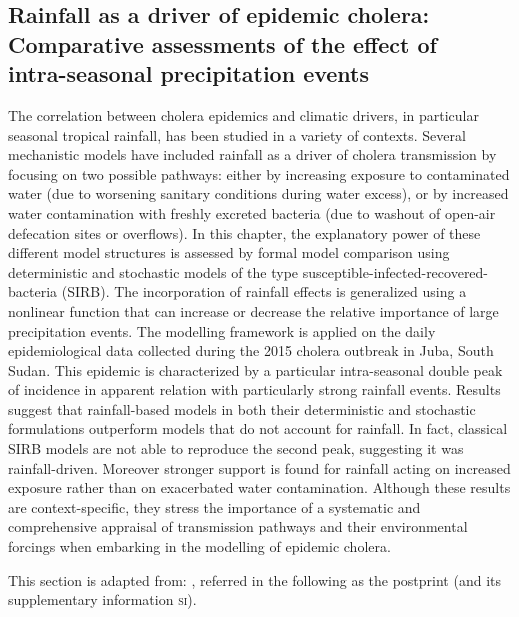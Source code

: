 \begin{fullwidth}
\chapter[Rainfall as a driver of epidemic cholera: Comparative assessments of the effect of intra-seasonal precipitation events]{Rainfall as a driver of epidemic cholera:\\Comparative assessments of the effect of\\intra-seasonal precipitation events}\label{ch:cholera-rainfall}

The correlation between cholera epidemics and climatic drivers, in particular seasonal tropical rainfall, has been studied in a variety of contexts. Several mechanistic models have included rainfall as a driver of cholera transmission by focusing on two possible pathways: either by increasing exposure to contaminated water (\eg due to worsening sanitary conditions during water excess), or by increased water contamination with freshly excreted bacteria (\eg due to washout of open-air defecation sites or overflows). In this chapter, the explanatory power of these different model structures is assessed by formal model comparison using deterministic and stochastic models of the type susceptible-infected-recovered-bacteria (SIRB). The incorporation of rainfall effects is generalized using a nonlinear function that can increase or decrease the relative importance of large precipitation events. The modelling framework is applied on the daily epidemiological data collected during the 2015 cholera outbreak in Juba, South Sudan. This epidemic is characterized by a particular intra-seasonal double peak of incidence in apparent relation with particularly strong rainfall events. Results suggest that rainfall-based models in both their deterministic and stochastic formulations outperform models that do not account for rainfall. In fact, classical SIRB models are not able to reproduce the second peak, suggesting it was rainfall-driven. Moreover stronger support is found for rainfall acting on increased exposure rather than on exacerbated water contamination. Although these results are context-specific, they stress the importance of a systematic and comprehensive appraisal of transmission pathways and their environmental forcings when embarking in the modelling of epidemic cholera.

This section is adapted from:
, referred in the following as the postprint (and its supplementary information \textsc{si}).%
\end{fullwidth}

